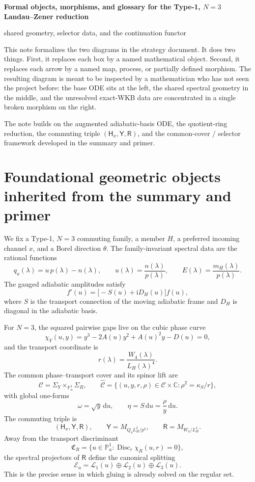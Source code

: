 \documentclass[11pt]{article}
\newcommand{\C}{\mathbb C}
\newcommand{\PP}{\mathbb P}
\newcommand{\ii}{\mathrm{i}}
\newcommand{\dd}{\mathrm{d}}
\newcommand{\Disc}{\operatorname{Disc}}
\newcommand{\CY}{\Sigma_Y}
\newcommand{\CR}{\Sigma_R}
\newcommand{\Chat}{\widehat{\mathcal C}}
\newcommand{\Cu}{\mathcal C}
\newcommand{\Eu}{\mathcal E}
\newcommand{\Hx}{\mathsf H_x}
\newcommand{\Yop}{\mathsf Y}
\newcommand{\Rop}{\mathsf R}
\newcommand{\CRam}{\mathfrak C_R}
\begin{document}
\begin{center}
{\Large\bfseries\color{TitleBlue}Formal objects, morphisms, and glossary for the Type-1, $N=3$ Landau--Zener reduction\par}
\vspace{0.35em}
{\large\color{AccentBlue}shared geometry, selector data, and the continuation functor\par}
\end{center}

This note formalizes the two diagrams in the strategy document.  It does two things.
First, it replaces each box by a named mathematical object.  Second, it replaces each arrow by a named map, process, or partially defined morphism.  The resulting diagram is meant to be inspected by a mathematician who has not seen the project before: the base ODE sits at the left, the shared spectral geometry in the middle, and the unresolved exact-WKB data are concentrated in a single broken morphism on the right.

The note builds on the augmented adiabatic-basis ODE, the quotient-ring reduction, the commuting triple $(\Hx,\Yop,\Rop)$, and the common-cover / selector framework developed in the summary and primer.

\section{Foundational geometric objects inherited from the summary and primer}

We fix a Type-1, $N=3$ commuting family, a member $H$, a preferred incoming channel $x$, and a Borel direction $\theta$.  The family-invariant spectral data are the rational functions
\[
q_u(\lambda)=u\,p(\lambda)-n(\lambda),
\qquad
u(\lambda)=\frac{n(\lambda)}{p(\lambda)},
\qquad
E(\lambda)=\frac{m_H(\lambda)}{p(\lambda)}.
\]
The gauged adiabatic amplitudes satisfy
\[
f'(u)=\bigl[-S(u)+\ii D_H(u)\bigr]f(u),
\]
where $S$ is the transport connection of the moving adiabatic frame and $D_H$ is diagonal in the adiabatic basis.

For $N=3$, the squared pairwise gaps live on the cubic phase curve
\[
\chi_Y(u,y)=y^3-2A(u)y^2+A(u)^2y-D(u)=0,
\]
and the transport coordinate is
\[
r(\lambda)=\frac{W_4(\lambda)}{L_H(\lambda)^4}.
\]
The common phase--transport cover and its spinor lift are
\[
\Cu=\CY\times_{\PP^1_u}\CR,
\qquad
\Chat=\{(u,y,r,\rho)\in \Cu\times\C:\rho^2=\kappa_S/r\},
\]
with global one-forms
\[
\omega=\sqrt{y}\,\dd u,
\qquad
\eta=S\,\dd u=\frac{\rho}{y}\,\dd u.
\]
The commuting triple is
\[
(\Hx,\Yop,\Rop),
\qquad
\Yop=M_{Q_4L_H^2/p^2},
\qquad
\Rop=M_{W_4/L_H^4}.
\]
Away from the transport discriminant
\[
\CRam=\{u\in\PP^1_u:\Disc_r\chi_R(u,r)=0\},
\]
the spectral projectors of $\Rop$ define the canonical splitting
\[
\Eu_u=\mathcal L_1(u)\oplus \mathcal L_2(u)\oplus \mathcal L_3(u).
\]
This is the precise sense in which gluing is already solved on the regular set.
\end{document}
